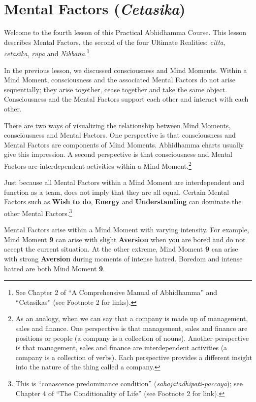 \section{Mental Factors (\textit{Cetasika})}

Welcome to the fourth lesson of this Practical Abhidhamma Course. This lesson describes Mental Factors, the second of the four Ultimate Realities: \textit{citta}, \textit{cetasika}, \textit{rūpa} and \textit{Nibbāna}.\footnote{See Chapter 2 of “A Comprehensive Manual of Abhidhamma” and “Cetasikas” (see Footnote 2 for links).}

In the previous lesson, we discussed consciousness and Mind Moments. Within a Mind Moment, consciousness and the associated Mental Factors do not arise sequentially; they arise together, cease together and take the same object. Consciousness and the Mental Factors support each other and interact with each other. 

There are two ways of visualizing the relationship between Mind Moments, consciousness and Mental Factors. One perspective is that consciousness and Mental Factors are components of Mind Moments. Abhidhamma charts usually give this impression. A second perspective is that consciousness and Mental Factors are interdependent activities within a Mind Moment.\footnote{As an analogy, when we can say that a company is made up of management, sales and finance. One perspective is that management, sales and finance are positions or people (a company is a collection of nouns). Another perspective is that management, sales and finance are interdependent activities (a company is a collection of verbs). Each perspective provides a different insight into the nature of the thing called a company.}

Just because all Mental Factors within a Mind Moment are interdependent and function as a team, does not imply that they are all equal. Certain Mental Factors such as \textbf{Wish to do}, \textbf{Energy} and \textbf{Understanding} can dominate the other Mental Factors.\footnote{This is “conascence predominance condition” (\textit{sahajātādhipati-paccaya}); see Chapter 4 of “The Conditionality of Life” (see Footnote 2 for link).} 

Mental Factors arise within a Mind Moment with varying intensity. For example, Mind Moment \textbf{9} can arise with slight \textbf{Aversion} when you are bored and do not accept the current situation. At the other extreme, Mind Moment \textbf{9} can arise with strong \textbf{Aversion} during moments of intense hatred. Boredom and intense hatred are both Mind Moment \textbf{9}.

